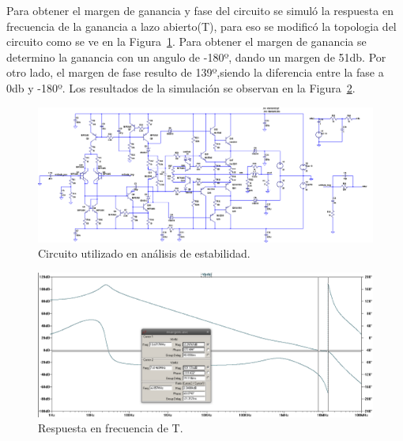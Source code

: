Para obtener el margen de ganancia y fase del circuito se simuló la respuesta en frecuencia de la ganancia a lazo abierto(T), para eso se modificó la topologia del circuito como se ve en la Figura~\ref{cir_simul_estab}. Para obtener el margen de ganancia se determino la ganancia con un angulo de -180º, dando un margen de 51db. Por otro lado, el margen de fase resulto de 139º,siendo la diferencia entre la fase a 0db y -180º.
Los resultados de la simulación se observan en la Figura~\ref{simul_estab}.

\begin{figure}[H]
\centering
\includegraphics[width=1\textwidth]{img/margen_fase_ganancia_cir.png}
\caption{Circuito utilizado en análisis de estabilidad.}
\label{cir_simul_estab}
\end{figure}


\begin{figure}[H]
\centering
\includegraphics[width=1\textwidth]{img/margen_fase_ganancia.png}
\caption{Respuesta en frecuencia de T.}
\label{simul_estab}
\end{figure}

\medskip
